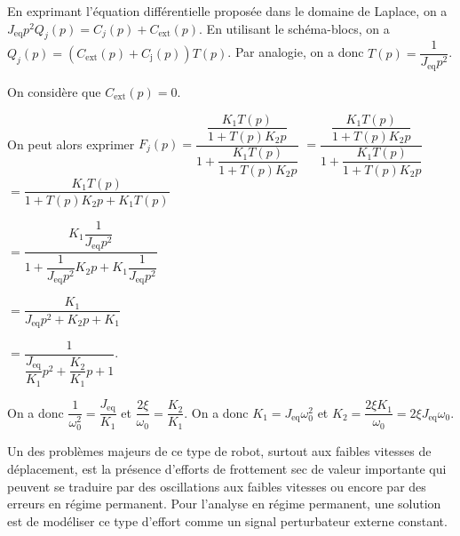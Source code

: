\ifprof
\begin{corrige}
En exprimant l'équation différentielle proposée dans le domaine de Laplace, on a 
$J_{\text{eq}} p^2{Q}_j(p)=C_j(p)+C_{\text{ext}}(p)$.
En utilisant le schéma-blocs, on a $Q_j(p)=\left(C_{\text{ext}}(p)+C_{\text{j}}(p)\right)T(p)$. 
Par analogie, on a donc $T(p)=\dfrac{1}{J_{\text{eq}}p^2}$.

On considère que $C_{\text{ext}}(p)=0$.  

On peut alors exprimer 
$F_j(p)= \dfrac{\dfrac{K_1T(p)}{1+T(p)K_2 p} }{1+\dfrac{K_1T(p)}{1+T(p)K_2 p}}$
$= \dfrac{\dfrac{K_1T(p)}{1+T(p)K_2 p} }{1+\dfrac{K_1T(p)}{1+T(p)K_2 p}}$
$= \dfrac{K_1T(p) }{1+T(p)K_2 p+K_1T(p)}$

$= \dfrac{K_1\dfrac{1}{J_{\text{eq}}p^2}}{1+\dfrac{1}{J_{\text{eq}}p^2}K_2 p+K_1\dfrac{1}{J_{\text{eq}}p^2}}$

$= \dfrac{K_1}{J_{\text{eq}}p^2+K_2 p+K_1}$

$= \dfrac{1}{\dfrac{J_{\text{eq}}}{K_1}p^2+\dfrac{K_2}{K_1}p+1}$.

On a donc $\dfrac{1}{\omega_0^2}=\dfrac{J_{\text{eq}}}{K_1}$ et $\dfrac{2\xi}{\omega_0}=\dfrac{K_2}{K_1}$. On a donc $K_1=J_{\text{eq}}\omega_0^2$ et $K_2=\dfrac{2\xi K_1}{\omega_0}=2\xi J_{\text{eq}}\omega_0$.
\end{corrige}
\else
\fi

\ifprof
\else
Un des problèmes majeurs de ce type de robot, surtout aux faibles vitesses de déplacement, est la présence d'efforts de frottement sec de valeur importante qui peuvent se traduire par des oscillations aux faibles vitesses ou encore par des erreurs en régime permanent. Pour l'analyse en régime permanent, une solution est de modéliser ce type d'effort comme un signal perturbateur externe constant.\\
\fi

